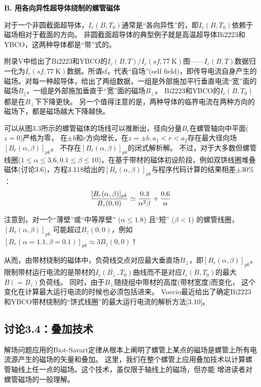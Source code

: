 \textbf{B. 用各向异性超导体绕制的螺管磁体}

对于一个非圆截面超导体，$I_c(B,T_0)$通常是“各向异性”的，即$I_c(B,T_0)$依赖于磁场相对于截面的方向。
非圆截面超导体的典型例子就是高温超导体Bi2223和YBCO，这两种导体都是“带”式的。

附录V中给出了Bi2223和YBCO的$I_c(B, T)/I_c(sf,77\ \mathrm{K})$图——$I_c(B, T)$数据归一化为$I_c(sf,77\ \mathrm{K})$数据。所谓sf，代表“自场”(self field)，即传导电流自身产生的磁场。对每一种超导体，给出了两组数据，一组是外部施加平行垂直电流“宽”面的磁场$B_{\parallel}$，一组是外部施加垂直于“宽”面的磁场$B_{\perp}$。 
Bi2223和YBCO的$I_c(B,T_0)$都是在$B_{\perp}$下下降更快。
另一个值得注意的是，两种导体的临界电流在两种方向的磁场下，都是磁场越大下降越快。

可以从图3.3所示的螺管磁体的场线可以推断出，径向分量$B_r$在螺管轴向中平面($z=0$)严格为零，
在$\pm b$和$r$方向增长，在$z=\pm b,a_1 < r < a_2$存在最大径向场$[B_r(\alpha,\beta)]_{pk}$。
不存在$[B_r(\alpha,\beta)]_{pk}$的闭式解析解。
不过，对于大多数但螺管线圈($1\le \alpha \le 3.6 , 0.1\le \beta \le 10$)，在基于带材的磁体初设阶段，例如双饼线圈堆叠磁体(讨论3.6)，方程3.118给出的$[B_{r}(\alpha,\beta)]_{pk}$与程序代码计算的结果相差$\pm 30\%$：
\begin{equation}
 \frac{[B_{r}(\alpha,\beta)]_{pk}}{B_{z}(0,0)}\simeq\frac{0.3}{\alpha^{2}\beta}+\frac{0.6}{\alpha}\\%
\end{equation}

注意到，对一个“薄壁”或“中等厚壁” ($\alpha \le 1.8$) 且“短” ($\beta < 1$) 的螺管线圈，
$[B_r(\alpha,\beta)]_{pk}$ 可能超过$B_z(0, 0)$，例如$[B_r(\alpha=1.1,\beta=0.1)]_{pk}\approx 3B_z(0,0)$！

从而，由带材绕制的磁体中，负荷线交点对应最大垂直场$B_{\perp}$，即$[B_r(\alpha,\beta)]_{pk}$。
限制带材运行电流的是带材的$I_c(B_{\perp},T_0)$曲线而不是对应$I_c(B, T_0)$的最大$B(=B_z)$负荷线。
同时，由于$B_{\perp}$随绕组中带材的高度(带材宽度)而变化，
这个变化在计算最大运行电流的时候也必须包括进来。
Voccio最近给出了确定Bi2223和YBCO带材绕制的“饼式线圈”的最大运行电流的解析方法[3.10]。

\newpage

\subsection{讨论3.4：叠加技术}
解场问题应用的Biot-Savart定律从根本上阐明了螺管上某点的磁场是螺管上所有电流源产生的磁场的矢量和叠加。
这里，我们在整个螺管上应用叠加技术以计算螺管轴线上任一点的磁场。这个技术，虽仅限于轴线上的磁场，但亦能
增进读者对螺管磁场的一般理解。

